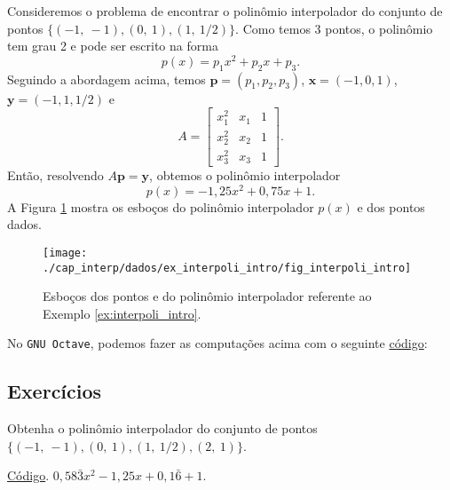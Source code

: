 \begin{ex}\label{ex:interpoli_intro}
  Consideremos o problema de encontrar o polinômio interpolador do conjunto de pontos $\{(-1,~-1), (0,~1), (1,~1/2)\}$. Como temos 3 pontos, o polinômio tem grau 2 e pode ser escrito na forma
  \begin{equation}
    p(x) = p_1x^2 + p_2x + p_3.
  \end{equation}
  Seguindo a abordagem acima, temos $\pmb{p}=(p_1, p_2, p_3)$, $\pmb{x} = (-1, 0, 1)$, $\pmb{y}=(-1, 1, 1/2)$ e
  \begin{equation}
    A =
    \begin{bmatrix}
      x_1^2 & x_1 & 1\\
      x_2^2 & x_2 & 1\\
      x_3^2 & x_3 & 1
    \end{bmatrix}.
  \end{equation}
  Então, resolvendo $A\pmb{p} = \pmb{y}$, obtemos o polinômio interpolador
  \begin{equation}
    p(x) = -1,25x^2 + 0,75x + 1.
  \end{equation}
A Figura \ref{fig:interpoli_intro} mostra os esboços do polinômio interpolador $p(x)$ e  dos pontos dados.

\begin{figure}[h!]
  \centering
  \texttt{[image: ./cap\_interp/dados/ex\_interpoli\_intro/fig\_interpoli\_intro]}
  \caption{Esboços dos pontos e do polinômio interpolador referente ao Exemplo \ref{ex:interpoli_intro}.}
  \label{fig:interpoli_intro}
\end{figure}

\ifisoctave
No \verb+GNU Octave+, podemos fazer as computações acima com o seguinte \href{https://github.com/phkonzen/notas/blob/master/src/MatematicaNumerica/cap_interp/dados/ex_interpoli_intro/ex_interpoli_intro.m}{código}:

\fi
\end{ex}

\subsection*{Exercícios}

\begin{exer}\label{exer:interpoli_intro1}
  Obtenha o polinômio interpolador do conjunto de pontos $\{(-1,~-1), (0,~1), (1,~1/2), (2,~1)\}$.
\end{exer}
\begin{resp}
\ifisoctave
\href{https://github.com/phkonzen/notas/blob/master/src/MatematicaNumerica/cap_interp/dados/exer_interpoli_intro1/exer_interpoli_intro1.m}{Código}.
\fi
$0,58\bar{3}x^2 - 1,25x + 0,1\bar{6} + 1$.  
\end{resp}

